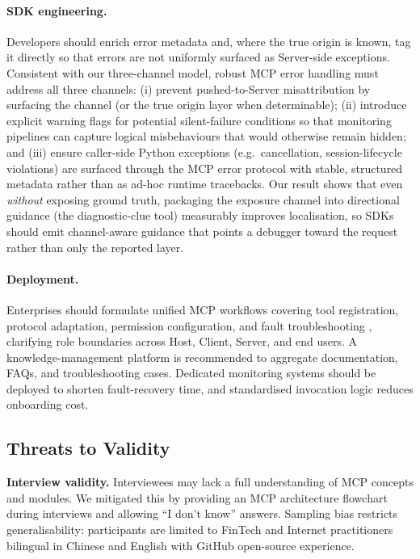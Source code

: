 \paragraph{SDK engineering.} Developers should enrich error metadata and, where the true
origin is known, tag it directly so that errors are not uniformly surfaced as Server-side
exceptions. Consistent with our three-channel model, robust MCP error handling must address all
three channels: (i) prevent pushed-to-Server misattribution by surfacing the channel (or the
true origin layer when determinable); (ii) introduce explicit warning flags for potential
silent-failure conditions so that monitoring pipelines can capture logical misbehaviours that
would otherwise remain hidden; and (iii) ensure caller-side Python exceptions (e.g.\
cancellation, session-lifecycle violations) are surfaced through the MCP error protocol with
stable, structured metadata rather than as ad-hoc runtime tracebacks. Our result shows that
even \emph{without} exposing ground truth, packaging the exposure channel into directional
guidance (the diagnostic-clue tool) measurably improves localisation, so SDKs should emit
channel-aware guidance that points a debugger toward the request rather than only the reported
layer.

\paragraph{Deployment.} Enterprises should formulate unified MCP workflows covering tool
registration, protocol adaptation, permission configuration, and fault troubleshooting
\cite{domanski2023digitalization}, clarifying role boundaries across Host, Client, Server,
and end users. A knowledge-management platform is recommended to aggregate documentation,
FAQs, and troubleshooting cases. Dedicated monitoring systems should be deployed to shorten
fault-recovery time, and standardised invocation logic reduces onboarding cost.

\subsection{Threats to Validity}

\textbf{Interview validity.} Interviewees may lack a full understanding of MCP concepts and
modules. We mitigated this by providing an MCP architecture flowchart during interviews and
allowing ``I don't know'' answers. Sampling bias restricts generalisability: participants are
limited to FinTech and Internet practitioners bilingual in Chinese and English with GitHub
open-source experience.

